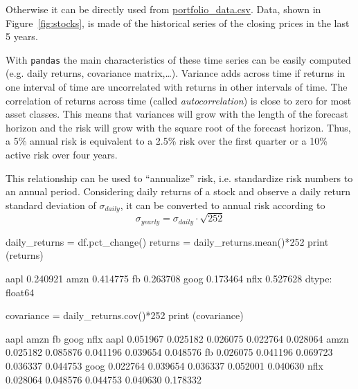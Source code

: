 Otherwise it can be directly used from \href{https://raw.githubusercontent.com/matteosan1/finance_course/develop/libro/input_files/portfolio_data.csv}{portfolio\_data.csv}. 
Data, shown in Figure~\ref{fig:stocks}, is made of the historical 
series of the closing prices in the last 5 years. 

With \texttt{pandas} the main characteristics of these time series can be easily computed (e.g. daily returns, covariance matrix,\ldots).
Variance adds across time if returns in one interval of time are uncorrelated with returns in other intervals of time. The correlation of returns across time (called \emph{autocorrelation}) is close to zero for most asset classes. This means that variances will grow with the length of the forecast horizon and the risk will grow with the square root of the forecast horizon. Thus, a 5\% annual risk is equivalent to a 2.5\% risk over the first quarter or a 10\% active risk over four years. 

This relationship can be used to “annualize” risk, i.e. standardize risk numbers to an annual period. Considering daily returns of a stock and observe a daily return standard deviation of $\sigma_{daily}$, it can be converted to annual risk according to
\begin{equation}
\sigma_{yearly} = \sigma_{daily}\cdot\sqrt{252}
\end{equation}

\begin{ipython}
daily_returns = df.pct_change()
returns = daily_returns.mean()*252
print (returns)
\end{ipython}
\begin{ioutput}
aapl    0.240921
amzn    0.414775
fb      0.263708
goog    0.173464
nflx    0.527628
dtype: float64
\end{ioutput}

\begin{ipython}
covariance = daily_returns.cov()*252
print (covariance)
\end{ipython}
\begin{ioutput}
          aapl      amzn        fb      goog      nflx
aapl  0.051967  0.025182  0.026075  0.022764  0.028064
amzn  0.025182  0.085876  0.041196  0.039654  0.048576
fb    0.026075  0.041196  0.069723  0.036337  0.044753
goog  0.022764  0.039654  0.036337  0.052001  0.040630
nflx  0.028064  0.048576  0.044753  0.040630  0.178332
\end{ioutput}

